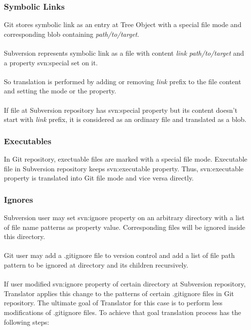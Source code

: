 \subsubsection{Symbolic Links}
Git stores symbolic link as an entry at Tree Object with a special file mode and corresponding blob containing \emph{path/to/target}.
\\\\
Subversion represents symbolic link as a file with content \emph{link path/to/target} and a property svn:special set on it.
\\\\
So translation is performed by adding or removing \emph{link } prefix to the file content and setting the mode or the property.
\\\\
If file at Subversion repository has svn:special property but its content doesn't start with \emph{link } prefix, it is considered as an ordinary file and translated as a blob.

\subsubsection{Executables}
In Git repository, exectuable files are marked with a special file mode. Executable file in Subversion repository keeps svn:executable property. 
Thus, svn:executable property is translated into Git file mode and vice versa directly.

\subsubsection{Ignores}
Subversion user may set svn:ignore property on an arbitrary directory with a list of file name patterns as property value. Corresponding files will be ignored inside this directory.
\\\\
Git user may add a .gitignore file to version control and add a list of file path pattern to be ignored at directory and its children recursively.
\\\\
If user modified svn:ignore property of certain directory at Subversion repository, Translator applies this change to the patterns of certain .gitignore files in Git repository. The ultimate goal of Translator for this case is to perform less modifications of .gitignore files. To achieve that goal translation process has the following steps:

